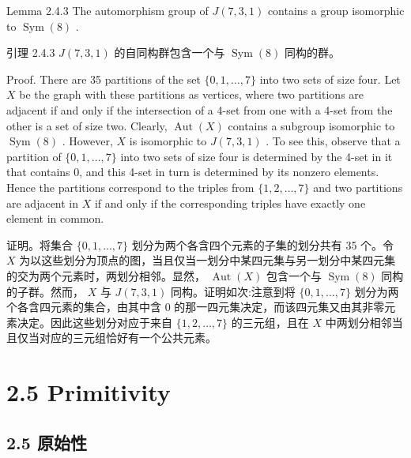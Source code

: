 \documentclass[10pt]{article}
\begin{document}
Lemma 2.4.3 The automorphism group of \(J\left( {7,3,1}\right)\) contains a group isomorphic to \(\operatorname{Sym}\left( 8\right)\) .

\begin{tcolorbox}\relax
引理 2.4.3 \(J\left( {7,3,1}\right)\) 的自同构群包含一个与 \(\operatorname{Sym}\left( 8\right)\) 同构的群。
\end{tcolorbox}

Proof. There are 35 partitions of the set \(\{ 0,1,\ldots ,7\}\) into two sets of size four. Let \(X\) be the graph with these partitions as vertices, where two partitions are adjacent if and only if the intersection of a 4-set from one with a 4-set from the other is a set of size two. Clearly, \(\operatorname{Aut}\left( X\right)\) contains a subgroup isomorphic to \(\operatorname{Sym}\left( 8\right)\) . However, \(X\) is isomorphic to \(J\left( {7,3,1}\right)\) . To see this, observe that a partition of \(\{ 0,1,\ldots ,7\}\) into two sets of size four is determined by the 4-set in it that contains 0, and this 4-set in turn is determined by its nonzero elements. Hence the partitions correspond to the triples from \(\{ 1,2,\ldots ,7\}\) and two partitions are adjacent in \(X\) if and only if the corresponding triples have exactly one element in common.

\begin{tcolorbox}\relax
证明。将集合 \(\{ 0,1,\ldots ,7\}\) 划分为两个各含四个元素的子集的划分共有 35 个。令 \(X\) 为以这些划分为顶点的图，当且仅当一划分中某四元集与另一划分中某四元集的交为两个元素时，两划分相邻。显然， \(\operatorname{Aut}\left( X\right)\) 包含一个与 \(\operatorname{Sym}\left( 8\right)\) 同构的子群。然而， \(X\) 与 \(J\left( {7,3,1}\right)\) 同构。证明如次:注意到将 \(\{ 0,1,\ldots ,7\}\) 划分为两个各含四元素的集合，由其中含 0 的那一四元集决定，而该四元集又由其非零元素决定。因此这些划分对应于来自 \(\{ 1,2,\ldots ,7\}\) 的三元组，且在 \(X\) 中两划分相邻当且仅当对应的三元组恰好有一个公共元素。
\end{tcolorbox}

\section*{2.5 Primitivity}

\begin{tcolorbox}\relax
\section*{2.5 原始性}
\end{tcolorbox}
\end{document}
